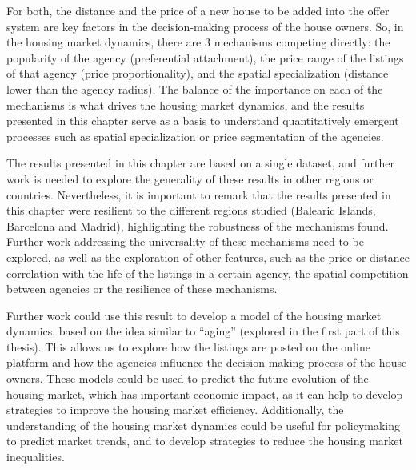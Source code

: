 For both, the distance and the price of a new house to be added into the offer system are key factors in the decision-making process of the house owners. So, in the housing market dynamics, there are 3 mechanisms competing directly: the popularity of the agency (preferential attachment), the price range of the listings of that agency (price proportionality), and the spatial specialization (distance lower than the agency radius). The balance of the importance on each of the mechanisms is what drives the housing market dynamics, and the results presented in this chapter serve as a basis to understand quantitatively emergent processes such as spatial specialization or price segmentation of the agencies.

The results presented in this chapter are based on a single dataset, and further work is needed to explore the generality of these results in other regions or countries. Nevertheless, it is important to remark that the results presented in this chapter were resilient to the different regions studied (Balearic Islands, Barcelona and Madrid), highlighting the robustness of the mechanisms found. Further work addressing the universality of these mechanisms need to be explored, as well as the exploration of other features, such as the price or distance correlation with the life of the listings in a certain agency, the spatial competition between agencies or the resilience of these mechanisms.

Further work could use this result to develop a model of the housing market dynamics, based on the idea similar to ``aging'' (explored in the first part of this thesis). This allows us to explore how the listings are posted on the online platform and how the agencies influence the decision-making process of the house owners. These models could be used to predict the future evolution of the housing market, which has important economic impact, as it can help to develop strategies to improve the housing market efficiency. Additionally, the understanding of the housing market dynamics could be useful for policymaking to predict market trends, and to develop strategies to reduce the housing market inequalities.